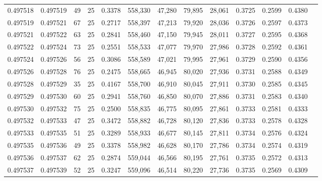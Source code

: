 \begin{tabular}{rrrrrrrrrrrrr}
0.497518 & 0.497519 &    49 &  25 &                                     0.3378 & 558,330 &  47,280 &  79,895 &  28,061 & 0.3725 & 0.2599 & 0.4380 \\
0.497519 & 0.497521 &    67 &  25 &                                     0.2717 & 558,397 &  47,213 &  79,920 &  28,036 & 0.3726 & 0.2597 & 0.4373 \\
0.497521 & 0.497522 &    63 &  25 &                                     0.2841 & 558,460 &  47,150 &  79,945 &  28,011 & 0.3727 & 0.2595 & 0.4368 \\
0.497522 & 0.497524 &    73 &  25 &                                     0.2551 & 558,533 &  47,077 &  79,970 &  27,986 & 0.3728 & 0.2592 & 0.4361 \\
0.497524 & 0.497526 &    56 &  25 &                                     0.3086 & 558,589 &  47,021 &  79,995 &  27,961 & 0.3729 & 0.2590 & 0.4356 \\
0.497526 & 0.497528 &    76 &  25 &                                     0.2475 & 558,665 &  46,945 &  80,020 &  27,936 & 0.3731 & 0.2588 & 0.4349 \\
0.497528 & 0.497529 &    35 &  25 &                                     0.4167 & 558,700 &  46,910 &  80,045 &  27,911 & 0.3730 & 0.2585 & 0.4345 \\
0.497529 & 0.497530 &    60 &  25 &                                     0.2941 & 558,760 &  46,850 &  80,070 &  27,886 & 0.3731 & 0.2583 & 0.4340 \\
0.497530 & 0.497532 &    75 &  25 &                                     0.2500 & 558,835 &  46,775 &  80,095 &  27,861 & 0.3733 & 0.2581 & 0.4333 \\
0.497532 & 0.497533 &    47 &  25 &                                     0.3472 & 558,882 &  46,728 &  80,120 &  27,836 & 0.3733 & 0.2578 & 0.4328 \\
0.497533 & 0.497535 &    51 &  25 &                                     0.3289 & 558,933 &  46,677 &  80,145 &  27,811 & 0.3734 & 0.2576 & 0.4324 \\
0.497535 & 0.497536 &    49 &  25 &                                     0.3378 & 558,982 &  46,628 &  80,170 &  27,786 & 0.3734 & 0.2574 & 0.4319 \\
0.497536 & 0.497537 &    62 &  25 &                                     0.2874 & 559,044 &  46,566 &  80,195 &  27,761 & 0.3735 & 0.2572 & 0.4313 \\
0.497537 & 0.497539 &    52 &  25 &                                     0.3247 & 559,096 &  46,514 &  80,220 &  27,736 & 0.3735 & 0.2569 & 0.4309 \\

\end{tabular}

